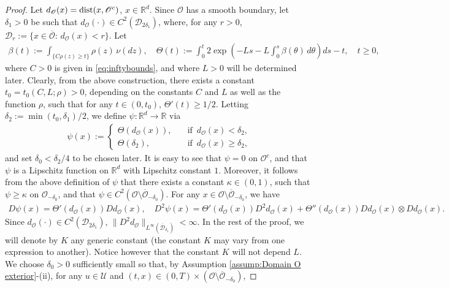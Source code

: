 \documentclass[amscd,amssymb,11pt]{article}
\numberwithin{theorem}{section}
\numberwithin{equation}{section}
\begin{document}
\begin{proof}
Let $d_{\mathscr{O}}(x)={\rm dist}(x,\mathscr{O}^{c})$, $x\in\mathbb{R}^{d}$. Since $\mathscr{O}$ has a smooth boundary, let $\delta_{1}>0$ be such that $d_{\mathscr{O}}(\cdot)\in C^{2}(\mathscr{D}_{2\delta_{1}})$, where, for any $r>0$, $\mathscr{D}_{r}:=\{x\in\overline{\mathscr{O}}:\,d_{\mathscr{O}}(x)<r\}$. Let
\begin{align*}
\beta(t):=\int_{\{C\rho(z)\geq t\}}\rho(z)\,\nu(dz),\quad\Theta(t):=\int_{0}^{t}2\exp\left(-Ls-L\int_{0}^{s}\beta(\theta)\,d\theta\right)ds-t,\quad t\geq 0,
\end{align*}
where $C>0$ is given in \eqref{eq:inftybounds}, and where $L>0$ will be determined later. Clearly, from the above construction, there exists a constant $t_{0}=t_{0}(C,L;\rho)>0$, depending on the constants $C$ and $L$ as well as the function $\rho$, such that for any $t\in(0,t_{0})$, $\Theta'(t)\geq 1/2$. Letting $\delta_{2}:=\min(t_{0},\delta_{1})/2$, we define $\psi:\mathbb{R}^{d}\rightarrow\mathbb{R}$ via
\begin{align*}
\psi(x):=\left\{\begin{array}{ll} \Theta(d_{\mathscr{O}}(x)),\quad &\text{if }\,d_{\mathscr{O}}(x)<\delta_{2}, \\ \Theta(\delta_{2}),\quad &\text{if }\,d_{\mathscr{O}}(x)\geq\delta_{2}, \end{array}\right.
\end{align*}
and set $\delta_{0}<\delta_{2}/4$ to be chosen later. It is easy to see that $\psi=0$ on $\mathscr{O}^{c}$, and that $\psi$ is a Lipschitz function on $\mathbb{R}^{d}$ with Lipschitz constant $1$. Moreover, it follows from the above definition of $\psi$ that there exists a constant $\kappa\in(0,1)$, such that $\psi\geq\kappa$ on $\mathscr{O}_{-\delta_{0}}$, and that $\psi\in C^{2}(\mathscr{O}\setminus\overline{\mathscr{O}}_{-\delta_{0}})$. For any $x\in\mathscr{O}\setminus\overline{\mathscr{O}}_{-\delta_{0}}$, we have
\begin{align*}
D\psi(x)=\Theta'(d_{\mathscr{O}}(x))Dd_{\mathscr{O}}(x),\quad D^{2}\psi(x)=\Theta'(d_{\mathscr{O}}(x))D^{2}d_{\mathscr{O}}(x)+\Theta''(d_{\mathscr{O}}(x))Dd_{\mathscr{O}}(x)\otimes Dd_{\mathscr{O}}(x).
\end{align*}
Since $d_{\mathscr{O}}(\cdot)\in C^{2}(\mathscr{D}_{2\delta_{1}})$, $\|D^{2}d_{\mathscr{O}}\|_{L^{\infty}(\overline{\mathscr{D}}_{\delta_{1}})}<\infty$. In the rest of the proof, we will denote by $K$ any generic constant (the constant $K$ may vary from one expression to another). Notice however that the constant $K$ will not depend $L$. We choose $\delta_{0}>0$ sufficiently small so that, by Assumption \ref{assump:Domain O exterior}-(ii), for any $u\in\mathcal{U}$ and $(t,x)\in(0,T)\times(\mathscr{O}\setminus\overline{\mathscr{O}}_{-\delta_{0}})$,

\end{proof}
\end{document}
